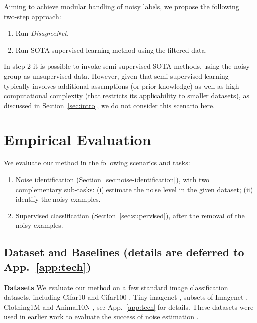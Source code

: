 \documentclass{article}
\newcommand{\myparagpar}[1]{\noindent\textbf{#1}}
\begin{document}
Aiming to achieve modular handling of noisy labels, we propose the following two-step approach:  
\begin{enumerate}[leftmargin=0.65cm]
\item Run \emph{DisagreeNet}.
\item Run SOTA supervised learning method using the filtered data.
\end{enumerate}
In step 2 it is possible to invoke semi-supervised SOTA methods, using the noisy group as unsupervised data. However, given that semi-supervised learning typically involves additional assumptions (or prior knowledge) as well as high computational complexity (that restricts its applicability to smaller datasets), as discussed in Section~\ref{sec:intro}, we do not consider this scenario here. 

\vspace{-.5em}
\section{Empirical Evaluation}
\label{sec:empirical}
\vspace{-0.5em}

We evaluate our method in the following scenarios and tasks:
\begin{enumerate}[leftmargin=0.65cm]
    \item Noise identification (Section~\ref{sec:noise-identification}), with two complementary sub-tasks: (i) estimate the noise level in the given dataset; (ii) identify the noisy examples. 
    \item Supervised classification (Section~\ref{sec:supervised}), after the removal of the noisy examples.
\end{enumerate}

\vspace{-.4em}
\subsection{Dataset and Baselines (\small{details are deferred to App.~\ref{app:tech})}}
\label{sec:prelem}
\vspace{-.4em}


\myparagpar{Datasets} We evaluate our method on a few standard image classification datasets, including Cifar10 and Cifar100  \citep{krizhevsky2009learning}, Tiny imagenet \citep{le2015tiny}, subsets of Imagenet \citep{deng2009imagenet}, Clothing1M \citep{clothing} and Animal10N \citep{animal10n}, see App.~\ref{app:tech} for details. These datasets were used in earlier work to evaluate the success of noise estimation \citep{pleiss2020identifying,arazo2019unsupervised,li2020dividemix,liu2020early}. 
\end{document}
